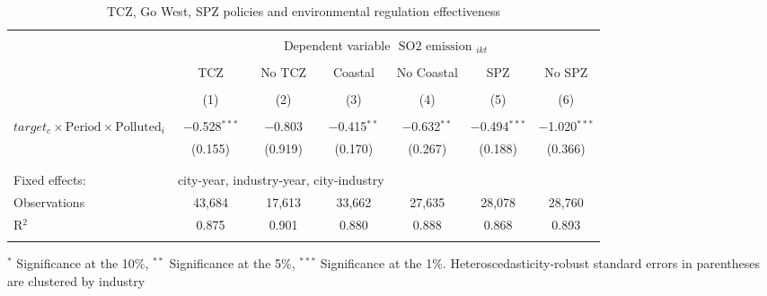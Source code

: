 \documentclass[12pt]{article}
\begin{document}
\begin{table}[!htb] \centering 
  \caption{\\ TCZ, Go West, SPZ policies and environmental regulation effectiveness} 
\label{table_7}
\begin{adjustbox}{width=\textwidth, totalheight=\baselineskip,keepaspectratio}
\begin{tabular}{@{\extracolsep{5pt}}lcccccc} 
\\[-1.8ex]\hline 
\hline \\[-1.8ex] 
 & \multicolumn{6}{c}{Dependent variable $\text { SO2 emission }_{i k t}$} \\ 
\cline{2-7}
            
\\[-1.8ex]
            &\multicolumn{1}{c}{TCZ}&\multicolumn{1}{c}{No TCZ}&\multicolumn{1}{c}{ Coastal }&\multicolumn{1}{c}{No  Coastal}&\multicolumn{1}{c}{ SPZ }&\multicolumn{1}{c}{No  SPZ}\\
\\[-1.8ex] &  (1) &  (2) &  (3) &  (4) &  (5) &  (6)\\ 
\hline \\[-1.8ex] 
   $target_c \times \text{Period} \times \text{Polluted}_i$  & $-$0.528$^{***}$ & $-$0.803 & $-$0.415$^{**}$ & $-$0.632$^{**}$ & $-$0.494$^{***}$ & $-$1.020$^{***}$ \\ 
  & (0.155) & (0.919) & (0.170) & (0.267) & (0.188) & (0.366) \\ 
\hline \\[-1.8ex] 
\\[-1.8ex]Fixed effects: & \multicolumn{3}{c}{city-year, industry-year, city-industry}\\
Observations & 43,684 & 17,613 & 33,662 & 27,635 & 28,078 & 28,760 \\ 
R$^{2}$ & 0.875 & 0.901 & 0.880 & 0.888 & 0.868 & 0.893 \\ 
\hline 
\hline \\[-1.8ex] 
\end{tabular}
\end{adjustbox}
\begin{tablenotes} 
 \small 
 \item
\footnotesize{
$^{*}$ Significance at the 10\%, $^{**}$ Significance at the 5\%, $^{***}$ Significance at the 1\%. Heteroscedasticity-robust standard errors in parentheses are clustered by industry 
}
 
\end{tablenotes}
\end{table}
\end{document}
